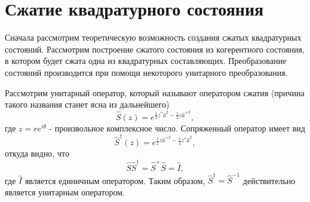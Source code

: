 \section{Сжатие квадратурного состояния}
Сначала рассмотрим теоретическую возможность создания сжатых
квадратурных состояний. Рассмотрим построение сжатого состояния из
когерентного состояния, в котором будет сжата одна из квадратурных
составляющих. Преобразование состояний производится при помощи
некоторого унитарного преобразования.

Рассмотрим унитарный оператор, который называют оператором сжатия
(причина такого названия станет ясна из дальнейшего)
\begin{equation}
\hat{S}\left(z\right) = e^{\frac{1}{2}z^{*}\hat{a}^2 -
\frac{1}{2}z\hat{a}^{+2}},
\nonumber
\end{equation}
где $z = r e^{i\theta}$ - произвольное комплексное число.
Сопряженный оператор имеет вид
\begin{equation}
\hat{S}^{\dag}\left(z\right) = e^{\frac{1}{2}z\hat{a}^{+2} -
\frac{1}{2}z^{*}\hat{a}^{2}}, 
\nonumber
\end{equation}
откуда видно, что
\begin{equation}
\hat{S} \hat{S}^{\dag} = \hat{S}^{+} \hat{S} = \hat{I},
\nonumber
\end{equation}
где $\hat{I}$ является единичным оператором. Таким образом, $\hat{S}^{\dag} =
\hat{S}^{-1}$ действительно является унитарным оператором.


